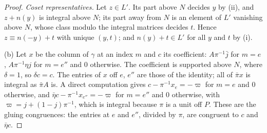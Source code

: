 \begin{proof}
\emph{Coset representatives.} Let $z\in L'$. Its part above $N$ decides $y$ by (ii), and $z+n(y)$ is integral above $N$; its part away from $N$ is an element of $L'$ vanishing above $N$, whose class modulo the integral matrices decides $t$. Hence $z\equiv n(-y)+t$ with unique $(y,t)$; and $n(y)+t\in L'$ for all $y$ and $t$ by (i).

(b) Let $x$ be the column of $\gamma$ at an index $m$ and $c$ its coefficient: $A\pi^{-1}\bar j$ for $m=e$, $A\pi^{-1}\eta j$ for $m=e''$ and $0$ otherwise. The coefficient is supported above $N$, where $\delta=1$, so $\delta c=c$. The entries of $x$ off $e$, $e''$ are those of the identity; all of $\bar\pi x$ is integral as $\bar\pi A$ is. A direct computation
gives $c-\pi^{-1}x_e=-\varpi$ for $m=e$ and $0$ otherwise, and $\bar\eta c-\pi^{-1}x_{e''}=-\varpi$ for $m=e''$ and $0$ otherwise, with $\varpi=j+(1-j)\pi^{-1}$, which is integral because $\pi$ is a unit off $P$. These are the gluing congruences: the entries at $e$ and $e''$, divided by $\pi$, are congruent to $c$ and $\bar\eta c$.
\end{proof}

